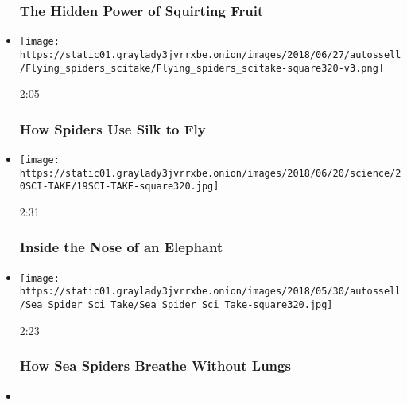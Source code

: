 \begin{itemize}
  \hypertarget{the-hidden-power-of-squirting-fruit}{%
  \subsubsection{The Hidden Power of Squirting
  Fruit}\label{the-hidden-power-of-squirting-fruit}}
\item
  \href{https://www.nytimes3xbfgragh.onion/video/science/100000005948406/how-spiders-use-silk-to-fly.html?action=click\&module=video-series-bar\&region=header\&pgtype=Article\&playlistId=video/sciencetake}{}

  \texttt{[image: https://static01.graylady3jvrrxbe.onion/images/2018/06/27/autossell/Flying\_spiders\_scitake/Flying\_spiders\_scitake-square320-v3.png]}

  2:05

  \hypertarget{how-spiders-use-silk-to-fly}{%
  \subsubsection{How Spiders Use Silk to
  Fly}\label{how-spiders-use-silk-to-fly}}
\item
  \href{https://www.nytimes3xbfgragh.onion/video/science/100000005936008/inside-the-nose-of-an-elephant.html?action=click\&module=video-series-bar\&region=header\&pgtype=Article\&playlistId=video/sciencetake}{}

  \texttt{[image: https://static01.graylady3jvrrxbe.onion/images/2018/06/20/science/20SCI-TAKE/19SCI-TAKE-square320.jpg]}

  2:31

  \hypertarget{inside-the-nose-of-an-elephant}{%
  \subsubsection{Inside the Nose of an
  Elephant}\label{inside-the-nose-of-an-elephant}}
\item
  \href{https://www.nytimes3xbfgragh.onion/video/science/100000005908234/no-lungs-no-gills-how-do-sea-spiders-breathe.html?action=click\&module=video-series-bar\&region=header\&pgtype=Article\&playlistId=video/sciencetake}{}

  \texttt{[image: https://static01.graylady3jvrrxbe.onion/images/2018/05/30/autossell/Sea\_Spider\_Sci\_Take/Sea\_Spider\_Sci\_Take-square320.jpg]}

  2:23

  \hypertarget{how-sea-spiders-breathe-without-lungs}{%
  \subsubsection{How Sea Spiders Breathe Without
  Lungs}\label{how-sea-spiders-breathe-without-lungs}}
\item
  \href{https://www.nytimes3xbfgragh.onion/video/science/100000005865737/did-asteroids-bring-water-to-earth.html?action=click\&module=video-series-bar\&region=header\&pgtype=Article\&playlistId=video/sciencetake}{}


\end{itemize}
